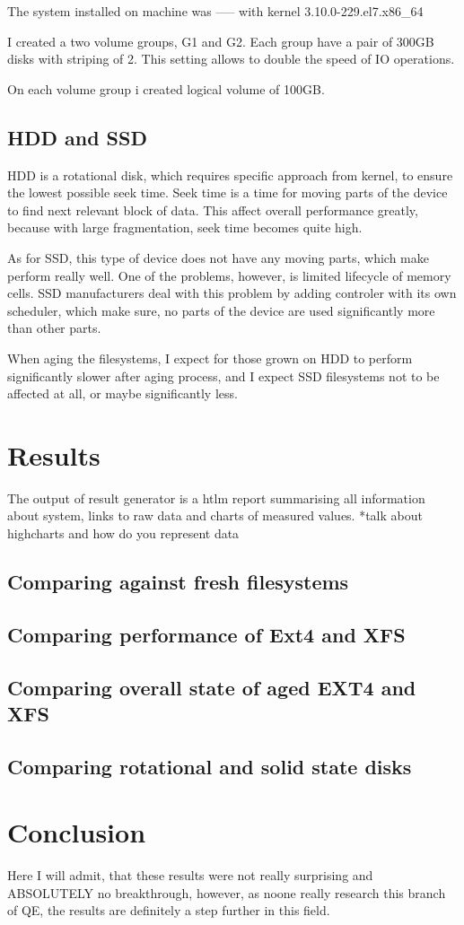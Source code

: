 \documentclass[
  color, %
  table, %
  lof,   %
  lot,   %
]{fithesis3}
\begin{document}
The system installed on machine was ----- with kernel 3.10.0-229.el7.x86\_64 

I created a two volume groups, G1 and G2. Each group have a pair of 300GB disks with striping of 2. This setting allows to double the speed of IO operations.

On each volume group i created logical volume of 100GB.
\section{HDD and SSD}
HDD is a rotational disk, which requires specific approach from kernel, to ensure the lowest possible seek time. Seek time is a time for moving parts of the device to find next relevant block of data. This affect overall performance greatly, because with large fragmentation, seek time becomes quite high.

As for SSD, this type of device does not have any moving parts, which make perform really well. One of the problems, however, is limited lifecycle of memory cells. SSD manufacturers deal with this problem by adding controler with its own scheduler, which make sure, no parts of the device are used significantly more than other parts.

When aging the filesystems, I expect for those grown on HDD to perform significantly slower after aging process, and I expect SSD filesystems not to be affected at all, or maybe significantly less.

\chapter{Results}
The output of result generator is a htlm report summarising all information about system, links to raw data and charts of measured values.
*talk about highcharts and how do you represent data

\section{Comparing against fresh filesystems}
\section{Comparing performance of Ext4 and XFS}
\section{Comparing overall state of aged EXT4 and XFS}
\section{Comparing rotational and solid state disks}
\chapter{Conclusion}
Here I will admit, that these results were not really surprising and ABSOLUTELY no breakthrough, however, as noone really research this branch of QE, the results are definitely a step further in this field.
\end{document}
